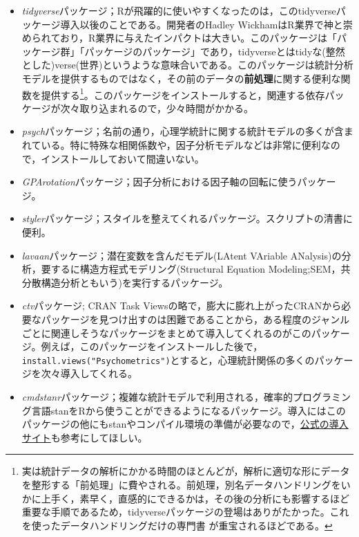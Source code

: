 \documentclass[
  a4paper,
]{ltjsbook}
\providecommand{\tightlist}{%
  \setlength{\itemsep}{0pt}\setlength{\parskip}{0pt}}
\begin{document}
\begin{itemize}
\tightlist
\item
  \emph{tidyverse}パッケージ\autocite{tidyverse}；Rが飛躍的に使いやすくなったのは，このtidyverseパッケージ導入以後のことである。開発者のHadley
  WickhamはR業界で神と崇められており，R業界に与えたインパクトは大きい。このパッケージは「パッケージ群」「パッケージのパッケージ」であり，tidyverseとはtidyな(整然とした)verse(世界)というような意味合いである。このパッケージは統計分析モデルを提供するものではなく，その前のデータの\textbf{前処理}に関する便利な関数を提供する\footnote{実は統計データの解析にかかる時間のほとんどが，解析に適切な形にデータを整形する「前処理」に費やされる。前処理，別名データハンドリングをいかに上手く，素早く，直感的にできるかは，その後の分析にも影響するほど重要な手順であるため，tidyverseパッケージの登場はありがたかった。これを使ったデータハンドリングだけの専門書
    \textcite{Kinosady2021} が重宝されるほどである。}。このパッケージをインストールすると，関連する依存パッケージが次々取り込まれるので，少々時間がかかる。
\item
  \emph{psych}パッケージ\autocite{psych}；名前の通り，心理学統計に関する統計モデルの多くが含まれている。特に特殊な相関係数や，因子分析モデルなどは非常に便利なので，インストールしておいて間違いない。
\item
  \emph{GPArotation}パッケージ\autocite{GPArotation}；因子分析における因子軸の回転に使うパッケージ。
\item
  \emph{styler}パッケージ；スタイルを整えてくれるパッケージ。スクリプトの清書に便利。
\item
  \emph{lavaan}パッケージ\autocite{lavaan}；潜在変数を含んだモデル(LAtent
  VAriable ANalysis)の分析，要するに構造方程式モデリング(Structural
  Equation Modeling;SEM，共分散構造分析ともいう)を実行するパッケージ。
\item
  \emph{ctv}パッケージ\autocite{CTV}; CRAN Task
  Viewsの略で，膨大に膨れ上がったCRANから必要なパッケージを見つけ出すのは困難であることから，ある程度のジャンルごとに関連しそうなパッケージをまとめて導入してくれるのがこのパッケージ。例えば，このパッケージをインストールした後で，\texttt{install.views("Psychometrics")}とすると，心理統計関係の多くのパッケージを次々導入してくれる。
\item
  \emph{cmdstanr}パッケージ\autocite{cmdstanr}；複雑な統計モデルで利用される，確率的プログラミング言語stanをRから使うことができるようになるパッケージ。導入にはこのパッケージの他にもstanやコンパイル環境の準備が必要なので，\href{https://mc-stan.org/cmdstanr/articles/cmdstanr.html}{公式の導入サイト}も参考にしてほしい。
\end{itemize}
\end{document}
